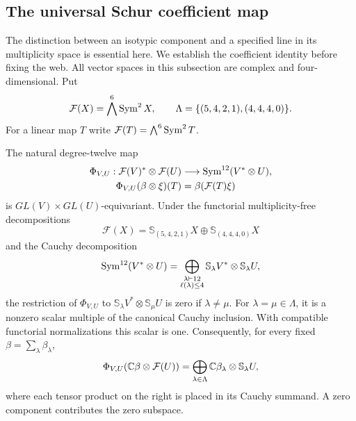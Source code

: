 \subsection{The universal Schur coefficient map}

The distinction between an isotypic component and a specified line in
its multiplicity space is essential here.  We establish the coefficient
identity before fixing the web.  All vector spaces in this subsection
are complex and four-dimensional.  Put
\[
 \mathcal F(X)=\bigwedge^6\operatorname{Sym}^2X,\qquad
 \Lambda=\{(5,4,2,1),(4,4,4,0)\}.
\]
For a linear map \(T\) write \(\mathcal F(T)=\bigwedge^6\operatorname{Sym}^2T\).

\begin{lemma}
\label{lem:universal-schur-readout}
The natural degree-twelve map
\begin{equation}\label{eq:universal-coefficient-map}
 \begin{split}
 \Phi_{V,U}:\mathcal F(V)^*\otimes\mathcal F(U)
       &\longrightarrow\operatorname{Sym}^{12}(V^*\otimes U),\\
 \Phi_{V,U}(\beta\otimes\xi)(T)&=\beta(\mathcal F(T)\xi)
 \end{split}
\end{equation}
is \(GL(V)\times GL(U)\)-equivariant.  Under the functorial
multiplicity-free decompositions
\begin{equation}\label{eq:minor-two-summands}
 \mathcal F(X)=\mathbb S_{(5,4,2,1)}X
                    \oplus\mathbb S_{(4,4,4,0)}X
\end{equation}
and the Cauchy decomposition
\[
 \operatorname{Sym}^{12}(V^*\otimes U)
   =\bigoplus_{\substack{\lambda\vdash12\\\ell(\lambda)\le4}}
       \mathbb S_\lambda V^*\otimes\mathbb S_\lambda U,
\]
the restriction of \(\Phi_{V,U}\) to
\(\mathbb S_\lambda V^*\otimes\mathbb S_\mu U\) is zero
if \(\lambda\ne\mu\).  For \(\lambda=\mu\in\Lambda\),
it is a nonzero scalar multiple of the canonical Cauchy inclusion.
With compatible functorial normalizations this scalar is one.
Consequently, for every fixed \(\beta=\sum_\lambda\beta_\lambda\),
\begin{equation}\label{eq:fixed-slice-universal}
 \Phi_{V,U}(\mathbb C\beta\otimes\mathcal F(U))
    =\bigoplus_{\lambda\in\Lambda}
          \mathbb C\beta_\lambda\otimes\mathbb S_\lambda U,
\end{equation}
where each tensor product on the right is placed in its Cauchy summand.
A zero component contributes the zero subspace.
\end{lemma}
